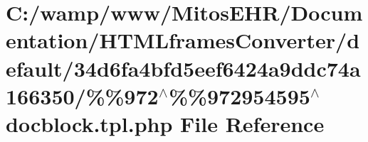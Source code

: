\hypertarget{default_234d6fa4bfd5eef6424a9ddc74a166350_2_06_06972_05_06_06972954595_05docblock_8tpl_8php}{\section{\-C\-:/wamp/www/\-Mitos\-E\-H\-R/\-Documentation/\-H\-T\-M\-Lframes\-Converter/default/34d6fa4bfd5eef6424a9ddc74a166350/\%\%972$^\wedge$\%\%972954595$^\wedge$docblock.tpl.\-php \-File \-Reference}
\label{default_234d6fa4bfd5eef6424a9ddc74a166350_2_06_06972_05_06_06972954595_05docblock_8tpl_8php}
}
